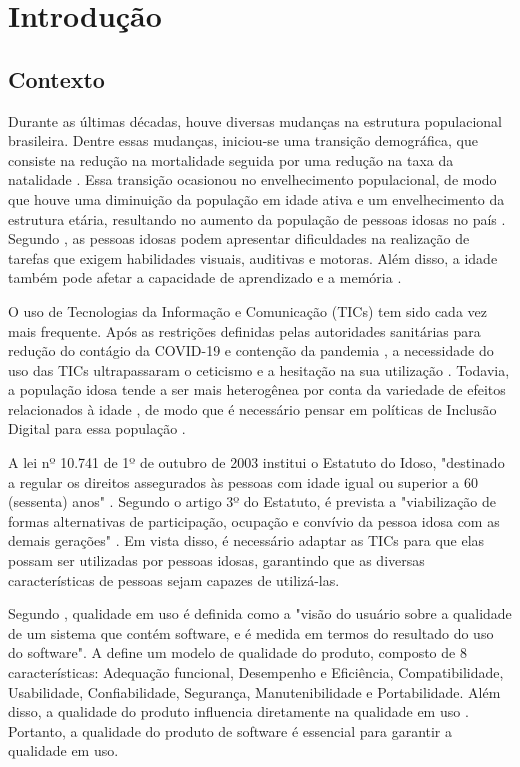 \chapter[Introdução]{Introdução}

\section{Contexto}

Durante as últimas décadas, houve diversas mudanças na estrutura populacional brasileira. Dentre essas mudanças, iniciou-se uma transição demográfica, que consiste na redução na mortalidade seguida por uma redução na taxa da natalidade \cite{travassos_elderly_2020}. Essa transição ocasionou no envelhecimento populacional, de modo que houve uma diminuição da população em idade ativa e um envelhecimento da estrutura etária, resultando no aumento da população de pessoas idosas no país \cite{vasconcelos_transicao_2012}. Segundo , as pessoas idosas podem apresentar dificuldades na realização de tarefas que exigem habilidades visuais, auditivas e motoras. Além disso, a idade também pode afetar a capacidade de aprendizado e a memória \cite{salthouse_when_2009}.

O uso de Tecnologias da Informação e Comunicação (TICs) tem sido cada vez mais frequente. Após as restrições definidas pelas autoridades sanitárias para redução do contágio da COVID-19 e contenção da pandemia \cite{anjos_recomendacao_nodate}, a necessidade do uso das TICs ultrapassaram o ceticismo e a hesitação na sua utilização \cite{sixsmith_older_2022}. Todavia, a população idosa tende a ser mais heterogênea por conta da variedade de efeitos relacionados à idade \cite{rodrigues2018support}, de modo que é necessário pensar em políticas de Inclusão Digital para essa população \cite{bez_inclusao_2006}. 

A lei nº 10.741 de 1º de outubro de 2003 institui o Estatuto do Idoso, "destinado a regular os direitos assegurados às pessoas com idade igual ou superior a 60 (sessenta) anos" \cite{lei10741}. Segundo o artigo 3º do Estatuto, é prevista a "viabilização de formas alternativas de participação, ocupação e convívio da pessoa idosa com as demais gerações"   \cite{lei10741}. Em vista disso, é necessário adaptar as TICs para que elas possam ser utilizadas por pessoas idosas, garantindo que as diversas características de pessoas sejam capazes de utilizá-las.

Segundo , qualidade em uso é definida como a "visão do usuário sobre a qualidade de um sistema que contém software, e é medida em termos do resultado do uso do software". A  define um modelo de qualidade do produto, composto de 8 características: Adequação funcional, Desempenho e Eficiência, Compatibilidade, Usabilidade, Confiabilidade, Segurança, Manutenibilidade e Portabilidade. Além disso, a qualidade do produto influencia diretamente na qualidade em uso . Portanto, a qualidade do produto de software é essencial para garantir a qualidade em uso. 


